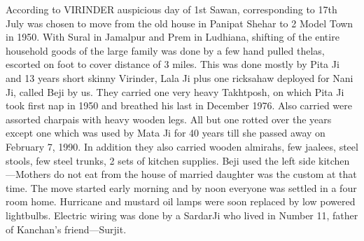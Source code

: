 According to VIRINDER auspicious day of 1st Sawan, corresponding to 17th July was chosen to move from the old house in Panipat Shehar to 2 Model Town in 1950. With Sural in Jamalpur and Prem in Ludhiana, shifting of the entire household goods of the large family was done by a few hand pulled thelas, escorted on foot to cover distance of 3 miles. This was done mostly by Pita Ji and 13 years short skinny Virinder, Lala Ji plus one ricksahaw deployed for Nani Ji, called Beji by us. They carried one very heavy Takhtposh, on which Pita Ji took first nap in 1950 and breathed his last in December 1976. Also carried were assorted charpais with heavy wooden legs. All but one rotted over the years except one which was used by Mata Ji for 40 years till she passed away on February 7, 1990. 
In addition they also carried wooden almirahs, few jaalees, steel stools, few steel trunks, 2 sets of kitchen supplies. Beji used the left side kitchen—Mothers do not eat from the house of married daughter was the custom at that time. 
The move started early morning and by noon everyone was settled in a four room home. Hurricane and mustard oil lamps were soon replaced by low powered lightbulbs. Electric wiring was done by a SardarJi who lived in Number 11, father of Kanchan’s friend—Surjit. 


